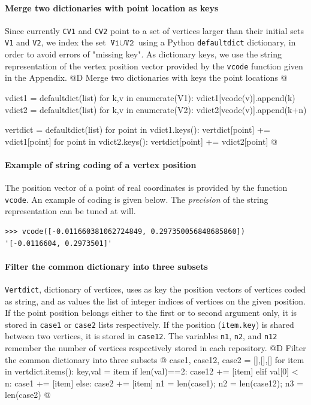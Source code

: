 \documentclass[11pt,oneside]{article}	%
\begin{document}
\paragraph{Merge two dictionaries with point location as keys}
Since currently \texttt{CV1} and \texttt{CV2} point to a set of vertices larger than their initial sets 
\texttt{V1} and \texttt{V2}, we index the set $\texttt{V1} \cup \texttt{V2}$ using a Python \texttt{defaultdict} dictionary, in order to avoid errors of "missing key". As dictionary keys, we use the string representation of the vertex position vector provided by the \texttt{vcode} function given in the Appendix.
@D Merge two dictionaries with keys the point locations
@{	vdict1 = defaultdict(list)
	for k,v in enumerate(V1): vdict1[vcode(v)].append(k) 
	vdict2 = defaultdict(list)
	for k,v in enumerate(V2): vdict2[vcode(v)].append(k+n) 
	
	vertdict = defaultdict(list)
	for point in vdict1.keys(): vertdict[point] += vdict1[point]
	for point in vdict2.keys(): vertdict[point] += vdict2[point]
@}

\paragraph{Example of string coding of a vertex position}
The position vector of a point of real coordinates is provided by the function \texttt{vcode}.
An example of coding is given below. The \emph{precision} of the string representation can be tuned at will.
{\small
\begin{verbatim}
>>> vcode([-0.011660381062724849, 0.297350056848685860])
'[-0.0116604, 0.2973501]'
\end{verbatim}}



\paragraph{Filter the common dictionary into three subsets}
\texttt{Vertdict}, dictionary of vertices, uses as key the position vectors of vertices coded as string, and as values the list of integer indices of vertices on the given position. If the point position belongs either to the first or to second argument only, it is stored in \texttt{case1} or \texttt{case2} lists respectively. If the position (\texttt{item.key}) is shared between two vertices, it is stored in \texttt{case12}.
The variables \texttt{n1}, \texttt{n2}, and \texttt{n12} remember the number of vertices respectively stored in each repository.
@D Filter the common dictionary into three subsets
@{	case1, case12, case2 = [],[],[]
	for item in vertdict.items():
		key,val = item
		if len(val)==2:  case12 += [item]
		elif val[0] < n: case1 += [item]
		else: case2 += [item]
	n1 = len(case1); n2 = len(case12); n3 = len(case2)
@}
\end{document}
